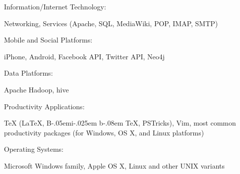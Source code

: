 \documentclass[10pt]{article}
\newenvironment{innerlist}[1][\enskip\textbullet]%
        {\begin{compactitem}[#1]}{\end{compactitem}}
\newcommand{\halfblankline}{\quad\vspace{-0.5\baselineskip}\pagebreak[3]}
\providecommand\BibTeX{{B\kern-.05em{\sc i\kern-.025em b}\kern-.08em
    \TeX}}
\begin{document}
\halfblankline

Information/Internet Technology:
%
\begin{innerlist}
    \item Networking, Services (Apache, SQL, MediaWiki, POP, IMAP, SMTP)
\end{innerlist}
\halfblankline

Mobile and Social Platforms:
%
\begin{innerlist}
    \item iPhone, Android, Facebook API, Twitter API, Neo4j
\end{innerlist}

\halfblankline

Data Platforms:
%
\begin{innerlist}
    \item Apache Hadoop, hive
\end{innerlist}

\halfblankline

Productivity Applications:
%
\begin{innerlist}
    \item \TeX{} (\LaTeX{}, \BibTeX{}, PSTricks), Vim,
        most common productivity packages (for Windows, OS X, and Linux
        platforms)
\end{innerlist}

\halfblankline

Operating Systems:
%
\begin{innerlist}
    \item Microsoft Windows family, Apple OS X, Linux and other UNIX variants
\end{innerlist}


%
%
\end{document}
